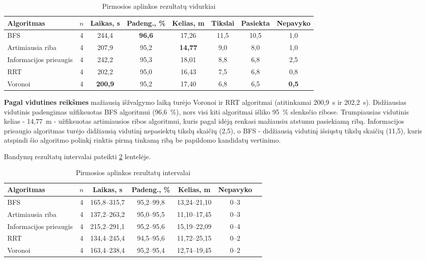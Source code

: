 \documentclass[]{VUMIFTemplateClass}
\begin{document}
\begin{table}[H]
\centering
\caption{Pirmosios aplinkos rezultatų vidurkiai}
\label{tab:results-room1-avg}
\small
\setlength{\tabcolsep}{3pt}
\begin{tabular}{|l|c|c|c|c|c|c|c|}
\hline
\textbf{Algoritmas} & \textbf{$n$} & \textbf{Laikas, s} & \textbf{Padeng., \%} & \textbf{Kelias, m} & \textbf{Tikslai} & \textbf{Pasiekta} & \textbf{Nepavyko} \\
\hline
BFS & 4 & 244,4 & \textbf{96,6} & 17,26 & 11,5 & 10,5 & 1,0 \\
\hline
Artimiausia riba & 4 & 207,9 & 95,2 & \textbf{14,77} & 9,0 & 8,0 & 1,0 \\
\hline
Informacijos prieaugis & 4 & 242,2 & 95,3 & 18,01 & 8,8 & 6,8 & 2,5 \\
\hline
RRT & 4 & 202,2 & 95,0 & 16,43 & 7,5 & 6,8 & 0,8 \\
\hline
Voronoi & 4 & \textbf{200,9} & 95,2 & 17,40 & 6,8 & 6,5 & \textbf{0,5} \\
\hline
\end{tabular}
\end{table}

\textbf{Pagal vidutines reikšmes} mažiausią išžvalgymo laiką turėjo Voronoi ir RRT algoritmai (atitinkamai 200,9~s ir 202,2~s). Didžiausias vidutinis padengimas
užfiksuotas BFS algoritmui (96,6~\%), nors visi kiti algoritmai išliko 95~\% slenksčio ribose. Trumpiausias vidutinis kelias - 14,77~m - užfiksuotas
artimiausios ribos algoritmui, kuris pagal idėją renkasi mažiausiu atstumu pasiekiamą ribą. Informacijos prieaugio algoritmas turėjo didžiausią
vidutinį nepasiektų tikslų skaičių (2,5), o BFS - didžiausią vidutinį išsiųstų tikslų skaičių (11,5), kuris atspindi šio algoritmo polinkį rinktis pirmą
tinkamą ribą be papildomo kandidatų vertinimo.

Bandymų rezultatų intervalai pateikti \ref{tab:results-room1-disp} lentelėje.

\begin{table}[H]
\centering
\caption{Pirmosios aplinkos rezultatų intervalai}
\label{tab:results-room1-disp}
\small
\setlength{\tabcolsep}{3pt}
\begin{tabular}{|l|c|c|c|c|c|c|}
\hline
\textbf{Algoritmas} & \textbf{$n$} & \textbf{Laikas, s} & \textbf{Padeng., \%} & \textbf{Kelias, m} & \textbf{Nepavyko} \\
\hline
BFS & 4 & 165,8--315,7 & 95,2--99,8 & 13,24--21,10 & 0--3 \\
\hline
Artimiausia riba & 4 & 137,2--263,2 & 95,0--95,5 & 11,10--17,45 & 0--3 \\
\hline
Informacijos prieaugis & 4 & 215,2--291,1 & 95,2--95,6 & 15,19--22,09 & 0--4 \\
\hline
RRT & 4 & 134,4--245,4 & 94,5--95,6 & 11,72--25,15 & 0--2 \\
\hline
Voronoi & 4 & 163,4--238,4 & 95,2--95,4 & 12,74--19,45 & 0--2 \\
\hline
\end{tabular}
\end{table}
\end{document}
